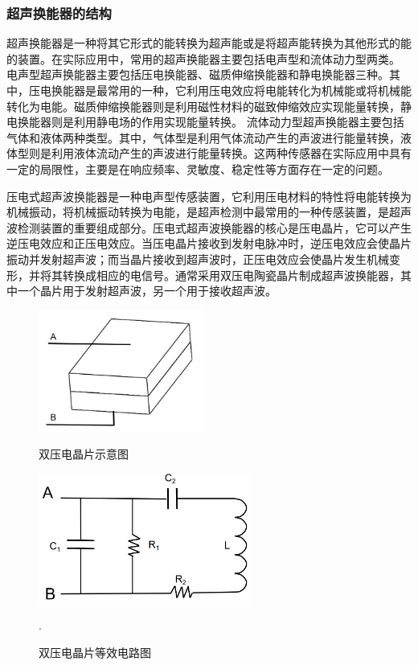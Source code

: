     \subsubsection{超声换能器的结构}
    超声换能器是一种将其它形式的能转换为超声能或是将超声能转换为其他形式的能的装置。在实际应用中，常用的超声换能器主要包括电声型和流体动力型两类。
    电声型超声换能器主要包括压电换能器、磁质伸缩换能器和静电换能器三种。其中，压电换能器是最常用的一种，它利用压电效应将电能转化为机械能或将机械能转化为电能。磁质伸缩换能器则是利用磁性材料的磁致伸缩效应实现能量转换，静电换能器则是利用静电场的作用实现能量转换。
    流体动力型超声换能器主要包括气体和液体两种类型。其中，气体型是利用气体流动产生的声波进行能量转换，液体型则是利用液体流动产生的声波进行能量转换。这两种传感器在实际应用中具有一定的局限性，主要是在响应频率、灵敏度、稳定性等方面存在一定的问题。\par
    压电式超声波换能器是一种电声型传感装置，它利用压电材料的特性将电能转换为机械振动，将机械振动转换为电能，是超声检测中最常用的一种传感装置，是超声波检测装置的重要组成部分。压电式超声波换能器的核心是压电晶片，它可以产生逆压电效应和正压电效应。当压电晶片接收到发射电脉冲时，逆压电效应会使晶片振动并发射超声波；而当晶片接收到超声波时，正压电效应会使晶片发生机械变形，并将其转换成相应的电信号。通常采用双压电陶瓷晶片制成超声波换能器，其中一个晶片用于发射超声波，另一个用于接收超声波。
    \begin{figure}[!h]

    	\begin{minipage}{0.5\textwidth}
    		\centering
    		\includegraphics[height=4cm]{figure/双压电晶片示意图.png}
    		\caption{双压电晶片示意图}
    		\label{双压电晶片示意图}
    	\end{minipage}
    \begin{minipage}{0.5\textwidth}
    	\centering
    	\includegraphics[height=4.25cm]{figure/双压电晶片等效电路.png}
    	\caption{双压电晶片等效电路图}
    	\label{双压电晶片等效电路图}.
    \end{minipage}
    \end{figure}

